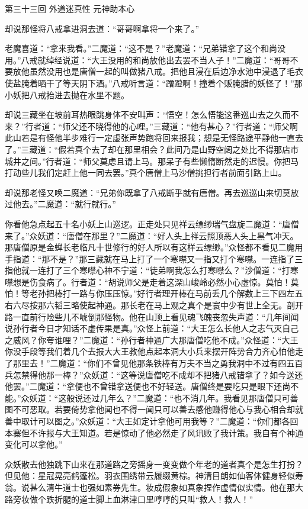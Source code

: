 \documentclass[12pt,UTF8]{ctexbook}
\begin{document}
第三十三回 外道迷真性 元神助本心

却说那怪将八戒拿进洞去道：“哥哥啊拿将一个来了。”

老魔喜道：“拿来我看。”二魔道：“这不是？”老魔道：“兄弟错拿了这个和尚没用。”八戒就绰经说道：“大王没用的和尚放他出去罢不当人子！”二魔道：“哥哥不要放他虽然没用也是唐僧一起的叫做猪八戒。把他且浸在后边净水池中浸退了毛衣使盐腌着晒干了等天阴下酒。”八戒听言道：“蹭蹬啊！撞着个贩腌腊的妖怪了！”那小妖把八戒抬进去抛在水里不题。

却说三藏坐在坡前耳热眼跳身体不安叫声：“悟空！怎么悟能这番巡山去之久而不来？”行者道：“师父还不晓得他的心哩。”三藏道：“他有甚心？”行者道：“师父啊此山若是有怪他半步难行一定虚张声势跑将回来报我；想是无怪路途平静他一直去了。”三藏道：“假若真个去了却在那里相会？此间乃是山野空阔之处比不得那店市城井之间。”行者道：“师父莫虑且请上马。那呆子有些懒惰断然走的迟慢。你把马打动些儿我们定赶上他一同去罢。”真个唐僧上马沙僧挑担行者前面引路上山。

却说那老怪又唤二魔道：“兄弟你既拿了八戒断乎就有唐僧。再去巡巡山来切莫放过他去。”二魔道：“就行就行。”

你看他急点起五十名小妖上山巡逻。正走处只见祥云缥缈瑞气盘旋二魔道：“唐僧来了。”众妖道：“唐僧在那里？”二魔道：“好人头上祥云照顶恶人头上黑气冲天。那唐僧原是金蝉长老临凡十世修行的好人所以有这样云缥缈。”众怪都不看见二魔用手指道：“那不是？”那三藏就在马上打了一个寒噤又一指又打个寒噤。一连指了三指他就一连打了三个寒噤心神不宁道：“徒弟啊我怎么打寒噤么？”沙僧道：“打寒噤想是伤食病了。行者道：“胡说师父是走着这深山峻岭必然小心虚惊。莫怕！莫怕！等老孙把棒打一路与你压压惊。”好行者理开棒在马前丢几个解数上三下四左五右六尽按那六韬三略使起神通。那长老在马上观之真个是寰中少有世上全无。剖开路一直前行险些儿不唬倒那怪物。他在山顶上看见魂飞魄丧忽失声道：“几年间闻说孙行者今日才知话不虚传果是真。”众怪上前道：“大王怎么长他人之志气灭自己之威风？你夸谁哩？”二魔道：“孙行者神通广大那唐僧吃他不成。”众怪道：“大王你没手段等我们着几个去报大大王教他点起本洞大小兵来摆开阵势合力齐心怕他走了那里去！”二魔道：“你们不曾见他那条铁棒有万夫不当之勇我洞中不过有四五百兵怎禁得他那一棒？”众妖道：“这等说唐僧吃不成却不把猪八戒错拿了？如今送还他罢。”二魔道：“拿便也不曾错拿送便也不好轻送。唐僧终是要吃只是眼下还尚不能。”众妖道：“这般说还过几年么？”二魔道：“也不消几年。我看见那唐僧只可善图不可恶取。若要倚势拿他闻也不得一闻只可以善去感他赚得他心与我心相合却就善中取计可以图之。”众妖道：“大王如定计拿他可用我等？”二魔道：“你们都各回本寨但不许报与大王知道。若是惊动了他必然走了风讯败了我计策。我自有个神通变化可以拿他。”

众妖散去他独跳下山来在那道路之旁摇身一变变做个年老的道者真个是怎生打扮？但见他：星冠晃亮鹤蓬松。羽衣围绣带云履缀黄棕。神清目朗如仙客体健身轻似寿翁。说甚么清牛道士也强如素券先生。妆成假象如真象捏作虚情似实情。他在那大路旁妆做个跌折腿的道士脚上血淋津口里哼哼的只叫“救人！救人！”
\end{document}
